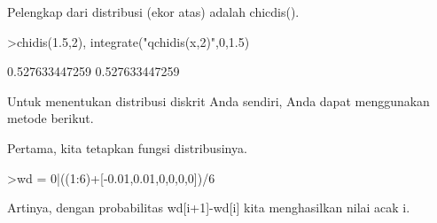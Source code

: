 \documentclass{article}
\begin{document}
\begin{eulernotebook}
\begin{eulercomment}
Pelengkap dari distribusi (ekor atas) adalah chicdis().
\end{eulercomment}
\begin{eulerprompt}
>chidis(1.5,2), integrate("qchidis(x,2)",0,1.5)
\end{eulerprompt}
\begin{euleroutput}
  0.527633447259
  0.527633447259
\end{euleroutput}
\begin{eulercomment}
Untuk menentukan distribusi diskrit Anda sendiri, Anda dapat
menggunakan metode berikut.

Pertama, kita tetapkan fungsi distribusinya.
\end{eulercomment}
\begin{eulerprompt}
>wd = 0|((1:6)+[-0.01,0.01,0,0,0,0])/6
\end{eulerprompt}
\begin{euleroutput}
  [0,  0.165,  0.335,  0.5,  0.666667,  0.833333,  1]
\end{euleroutput}
\begin{eulercomment}
Artinya, dengan probabilitas wd[i+1]-wd[i] kita menghasilkan nilai
acak i.


\end{eulercomment}
\end{eulernotebook}
\end{document}
